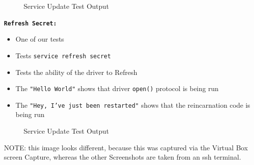 \documentclass[11pt]{article}
\begin{document}
\begin{adjustwidth}{.2in}{}
{      \begin{figure}[H]
         \centering
         \caption{Service Update Test Output}
         \label{fig:latex}
      \end{figure}

      {\tt \bf Refresh Secret: }

         \vspace{-5mm}
         \begin{itemize} 
         
            \item One of our tests

            \item Tests {\tt service refresh secret}

            \item Tests the ability of the driver to Refresh 

            \item The {\tt "Hello World"} shows that driver {\tt open()} protocol is being run

            \item The {\tt "Hey, I've just been restarted"} shows that the
            reincarnation code is being run

         \end{itemize}

      \begin{figure}[H]
         \centering
         \caption{Service Update Test Output}
         \label{fig:latex}
      \end{figure}

      \vspace{-5mm}
      {\small NOTE: this image looks different, because this was captured via the
               Virtual Box screen Capture, whereas the other Screenshots are
               taken from an ssh terminal.}



}\end{adjustwidth}
\end{document}
